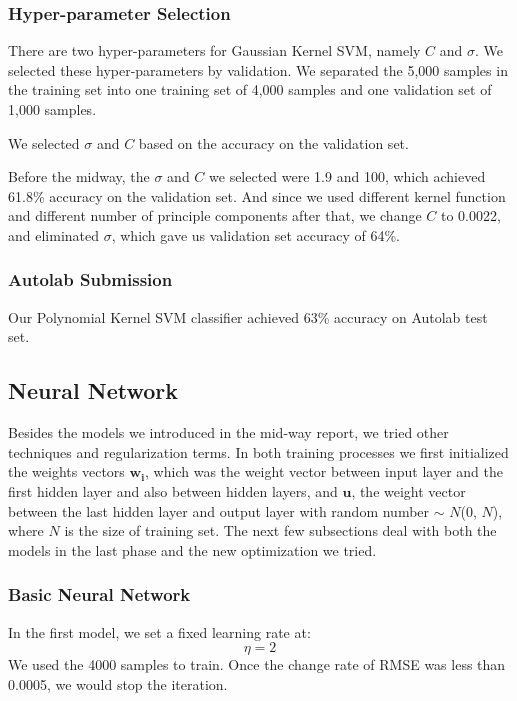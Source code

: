 \documentclass{article} %
\begin{document}
\subsubsection{Hyper-parameter Selection}

There are two hyper-parameters for Gaussian Kernel SVM, namely $C$ and $\sigma$. We selected these hyper-parameters by validation. We separated the 5,000 samples in the training set into one training set of 4,000 samples and one validation set of 1,000 samples.

We selected $\sigma$ and $C$ based on the accuracy on the validation set. 

Before the midway, the $\sigma$ and $C$ we selected were 1.9 and 100, which achieved 61.8\% accuracy on the validation set. And since we used different kernel function and different number of principle components  after that, we change $C$ to 0.0022, and eliminated $\sigma$, which gave us validation set accuracy of 64\%.

\subsubsection{Autolab Submission}
Our Polynomial Kernel SVM classifier achieved 63\% accuracy on Autolab test set.


\subsection{Neural Network}
Besides the models we introduced in the mid-way report, we tried other techniques and regularization terms. In both training processes we first initialized the weights vectors $\mathbf{w_i}$, which was the weight vector between input layer and the first hidden layer and also between hidden layers, and $\mathbf{u}$, the weight vector between the last hidden layer and output layer with random number $\sim$ $N$(0, $N$), where $N$ is the size of training set. The next few subsections deal with both the models in the last phase and the new optimization we tried.
\subsubsection{Basic Neural Network}
In the first model, we set a fixed learning rate at:
\begin{equation}
\eta = 2
\end{equation}
We used the 4000 samples to train. Once the change rate of RMSE was less than 0.0005, we would stop the iteration.
\end{document}
